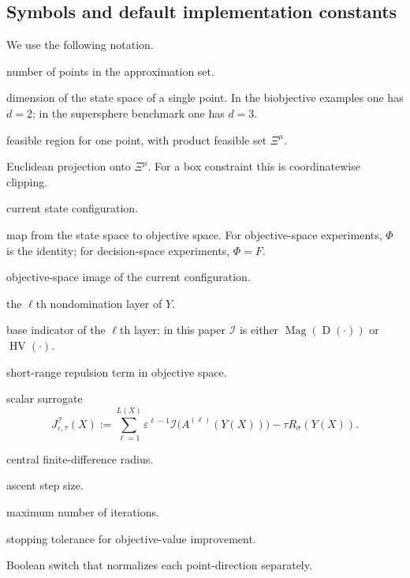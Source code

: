 \documentclass{article}
\newcommand{\Mag}{\operatorname{Mag}}
\newcommand{\HV}{\operatorname{HV}}
\newcommand{\front}[1]{A^{(#1)}}
\newcommand{\Dom}{\operatorname{D}}
\begin{document}
\subsection*{Symbols and default implementation constants}
We use the following notation.
\begin{description}[leftmargin=2.8cm,style=nextline]
\item[$\mu$] number of points in the approximation set.
\item[$d$] dimension of the state space of a single point. In the biobjective examples one has $d=2$; in the supersphere benchmark one has $d=3$.
\item[$\Xi\subseteq \mathbb{R}^{d}$] feasible region for one point, with product feasible set $\Xi^{\mu}$.
\item[$\Pi_{\Xi^{\mu}}$] Euclidean projection onto $\Xi^{\mu}$. For a box constraint this is coordinatewise clipping.
\item[$X=(x^{(1)},\dots,x^{(\mu)})\in \Xi^{\mu}$] current state configuration.
\item[$\Phi:\Xi\to\mathbb{R}^{m}$] map from the state space to objective space. For objective-space experiments, $\Phi$ is the identity; for decision-space experiments, $\Phi=F$.
\item[$Y(X)=(\Phi(x^{(1)}),\dots,\Phi(x^{(\mu)}))$] objective-space image of the current configuration.
\item[$\front{\ell}(Y)$] the $\ell$th nondomination layer of $Y$.
\item[$\mathcal I(\front{\ell}(Y))$] base indicator of the $\ell$th layer; in this paper $\mathcal I$ is either $\Mag(\Dom(\cdot))$ or $\HV(\cdot)$.
\item[$R_{\sigma}(Y)$] short-range repulsion term in objective space.
\item[$J_{\varepsilon,\tau}(X)$] scalar surrogate
\[
J^{\mathcal I}_{\varepsilon,\tau}(X):=\sum_{\ell=1}^{L(X)} \varepsilon^{\ell-1}\mathcal I\!\bigl(\front{\ell}(Y(X))\bigr)-\tau R_{\sigma}(Y(X)).
\]
\item[$h$] central finite-difference radius.
\item[$\alpha$] ascent step size.
\item[$K_{\max}$] maximum number of iterations.
\item[$\delta_{\mathrm{val}}$] stopping tolerance for objective-value improvement.
\item[$\texttt{normalize\_per\_point}$] Boolean switch that normalizes each point-direction separately.
\end{description}
\end{document}
